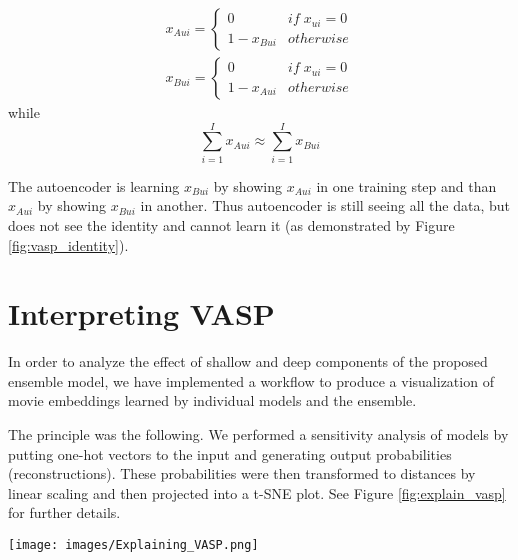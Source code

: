 \documentclass[conference]{IEEEtran}
\begin{document}
            \begin{equation}\label{p_t} 
                \begin{aligned}
                    x_{Aui}=\begin{cases}0 & if \; x_{ui} = 0\\1-x_{Bui}& otherwise\end{cases} \\
                    x_{Bui}=\begin{cases}0 & if \; x_{ui} = 0\\1-x_{Aui}& otherwise\end{cases}
                \end{aligned}
            \end{equation} while 
            \begin{equation}
                    \sum_{i=1}^I{x_{Aui}} \approx \sum_{i=1}^I{x_{Bui}}
            \end{equation}
        
        
        The autoencoder is learning \(x_{Bui}\) by showing \(x_{Aui}\) in one training step and than \(x_{Aui}\) by showing \(x_{Bui}\) in another.  Thus autoencoder is still seeing all the data, but does not see the identity and cannot learn it (as demonstrated by Figure \ref{fig:vasp_identity}).
            


\section{Interpreting VASP}
In order to analyze the effect of shallow and deep components of the proposed ensemble model, we have implemented a workflow to produce a visualization of movie embeddings learned by individual models and the ensemble.

The principle was the following. We performed a sensitivity analysis of models by putting one-hot vectors to the input and generating output probabilities (reconstructions). These probabilities were then transformed to distances by linear scaling and then projected into a t-SNE plot. See Figure \ref{fig:explain_vasp} for further details.
  \begin{figure*}
            \centering 
            \texttt{[image: images/Explaining\_VASP.png]} 
            \caption{Explaining VASP on MovieLens20M Dataset: Output of the joint model (left) was linearly decomposed to EASE component (middle) and FLVAE component (right) to demonstrate that EASE is learning more apparent linear dependencies and FLVAE the non-linear ones. Red = Horrors, Blue = Children movies, Green = Western movies and Yellow = Noir.
            }
            \label{fig:explain_vasp}
    \end{figure*}  
   
\end{document}
